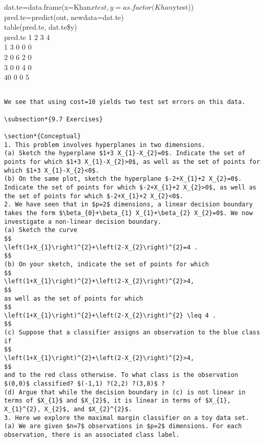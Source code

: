 \documentclass[10pt]{article}
\begin{document}
\begin{displayquote}
dat.te=data.frame(x=Khan$xtest, y=as.factor(Khan$ytest))\\
pred.te=predict(out, newdata=dat.te)\\
table(pred.te, dat.te\$y)\\
pred.te 1 2 3 4\\
1 3 0 0 0\\
2 0 6 2 0\\
3 0 0 4 0\\
40 0 0 5
\end{displayquote}

\begin{verbatim}

We see that using cost=10 yields two test set errors on this data.

\subsection*{9.7 Exercises}

\section*{Conceptual}
1. This problem involves hyperplanes in two dimensions.
(a) Sketch the hyperplane $1+3 X_{1}-X_{2}=0$. Indicate the set of points for which $1+3 X_{1}-X_{2}>0$, as well as the set of points for which $1+3 X_{1}-X_{2}<0$.
(b) On the same plot, sketch the hyperplane $-2+X_{1}+2 X_{2}=0$. Indicate the set of points for which $-2+X_{1}+2 X_{2}>0$, as well as the set of points for which $-2+X_{1}+2 X_{2}<0$.
2. We have seen that in $p=2$ dimensions, a linear decision boundary takes the form $\beta_{0}+\beta_{1} X_{1}+\beta_{2} X_{2}=0$. We now investigate a non-linear decision boundary.
(a) Sketch the curve
$$
\left(1+X_{1}\right)^{2}+\left(2-X_{2}\right)^{2}=4 .
$$
(b) On your sketch, indicate the set of points for which
$$
\left(1+X_{1}\right)^{2}+\left(2-X_{2}\right)^{2}>4,
$$
as well as the set of points for which
$$
\left(1+X_{1}\right)^{2}+\left(2-X_{2}\right)^{2} \leq 4 .
$$
(c) Suppose that a classifier assigns an observation to the blue class if
$$
\left(1+X_{1}\right)^{2}+\left(2-X_{2}\right)^{2}>4,
$$
and to the red class otherwise. To what class is the observation $(0,0)$ classified? $(-1,1) ?(2,2) ?(3,8)$ ?
(d) Argue that while the decision boundary in (c) is not linear in terms of $X_{1}$ and $X_{2}$, it is linear in terms of $X_{1}, X_{1}^{2}, X_{2}$, and $X_{2}^{2}$.
3. Here we explore the maximal margin classifier on a toy data set.
(a) We are given $n=7$ observations in $p=2$ dimensions. For each observation, there is an associated class label.


\end{verbatim}
\end{document}
